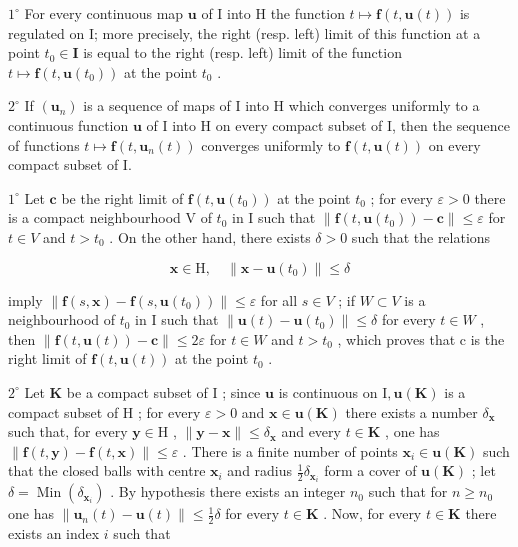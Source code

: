 \(1^{\circ}\) For every continuous map \(\mathbf{u}\) of I into H the function \(t \mapsto \mathbf{f}(t, \mathbf{u}(t))\) is regulated on I; more precisely, the right (resp. left) limit of this function at a point \(t_0 \in \mathbf{I}\) is equal to the right (resp. left) limit of the function \(t \mapsto \mathbf{f}(t, \mathbf{u}(t_0))\) at the point \(t_0\) .

\(2^{\circ}\) If \((\mathbf{u}_n)\) is a sequence of maps of I into H which converges uniformly to a continuous function \(\mathbf{u}\) of I into H on every compact subset of I, then the sequence of functions \(t \mapsto \mathbf{f}(t, \mathbf{u}_n(t))\) converges uniformly to \(\mathbf{f}(t, \mathbf{u}(t))\) on every compact subset of I.

\(1^{\circ}\) Let \(\mathbf{c}\) be the right limit of \(\mathbf{f}(t, \mathbf{u}(t_0))\) at the point \(t_0\) ; for every \(\varepsilon > 0\) there is a compact neighbourhood V of \(t_0\) in I such that \(\| \mathbf{f}(t, \mathbf{u}(t_0)) - \mathbf{c} \| \leqslant \varepsilon\) for \(t \in V\) and \(t > t_0\) . On the other hand, there exists \(\delta > 0\) such that the relations

\[
\mathbf {x} \in \mathrm{H}, \quad \| \mathbf {x} - \mathbf {u} (t _ {0}) \| \leqslant \delta
\]

imply \(\|\mathbf{f}(s,\mathbf{x})-\mathbf{f}(s,\mathbf{u}(t_{0}))\|\leqslant\varepsilon\) for all \(s\in V\) ; if \(W\subset V\) is a neighbourhood of \(t_{0}\) in I such that \(\|\mathbf{u}(t)-\mathbf{u}(t_{0})\|\leqslant\delta\) for every \(t\in W\) , then \(\|\mathbf{f}(t,\mathbf{u}(t))-\mathbf{c}\|\leqslant2\varepsilon\) for \(t\in W\) and \(t>t_{0}\) , which proves that c is the right limit of \(\mathbf{f}(t,\mathbf{u}(t))\) at the point \(t_{0}\) .

\(2^{\circ}\) Let \(\mathbf{K}\) be a compact subset of \(\mathrm{I}\) ; since \(\mathbf{u}\) is continuous on \(\mathrm{I}, \mathbf{u}(\mathbf{K})\) is a compact subset of \(\mathrm{H}\) ; for every \(\varepsilon > 0\) and \(\mathbf{x} \in \mathbf{u}(\mathbf{K})\) there exists a number \(\delta_{\mathbf{x}}\) such that, for every \(\mathbf{y} \in \mathrm{H}\) , \(\| \mathbf{y} - \mathbf{x} \| \leqslant \delta_{\mathbf{x}}\) and every \(t \in \mathbf{K}\) , one has \(\| \mathbf{f}(t, \mathbf{y}) - \mathbf{f}(t, \mathbf{x}) \| \leqslant \varepsilon\) . There is a finite number of points \(\mathbf{x}_i \in \mathbf{u}(\mathbf{K})\) such that the closed balls with centre \(\mathbf{x}_i\) and radius \(\frac{1}{2} \delta_{\mathbf{x}_i}\) form a cover of \(\mathbf{u}(\mathbf{K})\) ; let \(\delta = \operatorname{Min}\left(\delta_{\mathbf{x}_i}\right)\) . By hypothesis there exists an integer \(n_0\) such that for \(n \geqslant n_0\) one has \(\| \mathbf{u}_n(t) - \mathbf{u}(t) \| \leqslant \frac{1}{2} \delta\) for every \(t \in \mathbf{K}\) . Now, for every \(t \in \mathbf{K}\) there exists an index \(i\) such that

